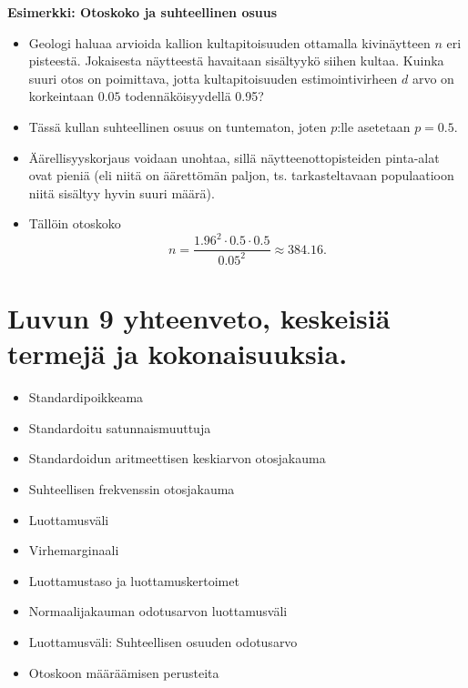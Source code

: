 \documentclass[
]{book}
\providecommand{\tightlist}{%
  \setlength{\itemsep}{0pt}\setlength{\parskip}{0pt}}
\begin{document}
\begin{eblock}{}

\textbf{Esimerkki: Otoskoko ja suhteellinen osuus}

\begin{itemize}
\item
  Geologi haluaa arvioida kallion kultapitoisuuden ottamalla kivinäytteen \(n\) eri pisteestä. Jokaisesta näytteestä havaitaan sisältyykö siihen kultaa. Kuinka suuri otos on poimittava, jotta kultapitoisuuden estimointivirheen \(d\) arvo on korkeintaan \(0.05\) todennäköisyydellä 0.95?
\item
  Tässä kullan suhteellinen osuus on tuntematon, joten \(p\):lle asetetaan \(p=0.5\).
\item
  Äärellisyyskorjaus voidaan unohtaa, sillä näytteenottopisteiden pinta-alat ovat pieniä (eli niitä on äärettömän paljon, ts. tarkasteltavaan populaatioon niitä sisältyy
  hyvin suuri määrä).
\item
  Tällöin otoskoko
  \[
  n = \frac{1.96^2 \cdot 0.5 \cdot 0.5}{0.05^2} \approx 384.16.
  \]
\end{itemize}

\end{eblock}

\hypertarget{luvun-9-yhteenveto-keskeisiuxe4-termejuxe4-ja-kokonaisuuksia.}{%
\section{Luvun 9 yhteenveto, keskeisiä termejä ja kokonaisuuksia.}\label{luvun-9-yhteenveto-keskeisiuxe4-termejuxe4-ja-kokonaisuuksia.}}

\begin{itemize}
\tightlist
\item
  Standardipoikkeama\\
\item
  Standardoitu satunnaismuuttuja\\
\item
  Standardoidun aritmeettisen keskiarvon otosjakauma\\
\item
  Suhteellisen frekvenssin otosjakauma\\
\item
  Luottamusväli
\item
  Virhemarginaali
\item
  Luottamustaso ja luottamuskertoimet
\item
  Normaalijakauman odotusarvon luottamusväli
\item
  Luottamusväli: Suhteellisen osuuden odotusarvo
\item
  Otoskoon määräämisen perusteita
\end{itemize}
\end{document}
